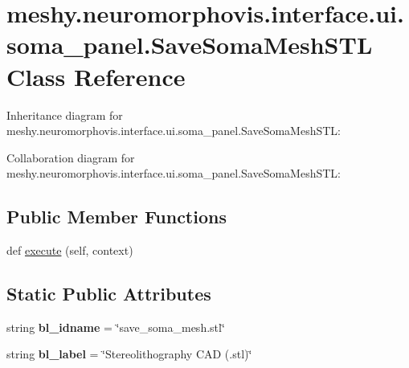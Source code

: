 \hypertarget{classmeshy_1_1neuromorphovis_1_1interface_1_1ui_1_1soma__panel_1_1SaveSomaMeshSTL}{}\section{meshy.\+neuromorphovis.\+interface.\+ui.\+soma\+\_\+panel.\+Save\+Soma\+Mesh\+S\+TL Class Reference}
\label{classmeshy_1_1neuromorphovis_1_1interface_1_1ui_1_1soma__panel_1_1SaveSomaMeshSTL}


Inheritance diagram for meshy.\+neuromorphovis.\+interface.\+ui.\+soma\+\_\+panel.\+Save\+Soma\+Mesh\+S\+TL\+:


Collaboration diagram for meshy.\+neuromorphovis.\+interface.\+ui.\+soma\+\_\+panel.\+Save\+Soma\+Mesh\+S\+TL\+:
\subsection*{Public Member Functions}
\begin{DoxyCompactItemize}
\item 
def \hyperlink{classmeshy_1_1neuromorphovis_1_1interface_1_1ui_1_1soma__panel_1_1SaveSomaMeshSTL_af531407a215235096daee64609436907}{execute} (self, context)
\end{DoxyCompactItemize}
\subsection*{Static Public Attributes}
\begin{DoxyCompactItemize}
\item 
string {\bfseries bl\+\_\+idname} = \char`\"{}save\+\_\+soma\+\_\+mesh.\+stl\char`\"{}\hypertarget{classmeshy_1_1neuromorphovis_1_1interface_1_1ui_1_1soma__panel_1_1SaveSomaMeshSTL_ac07f5b99266d944eeeeccb9d1a773ed9}{}\label{classmeshy_1_1neuromorphovis_1_1interface_1_1ui_1_1soma__panel_1_1SaveSomaMeshSTL_ac07f5b99266d944eeeeccb9d1a773ed9}

\item 
string {\bfseries bl\+\_\+label} = \char`\"{}Stereolithography C\+AD (.stl)\char`\"{}\hypertarget{classmeshy_1_1neuromorphovis_1_1interface_1_1ui_1_1soma__panel_1_1SaveSomaMeshSTL_aece1cd5de45167fdfbbf34668e251175}{}\label{classmeshy_1_1neuromorphovis_1_1interface_1_1ui_1_1soma__panel_1_1SaveSomaMeshSTL_aece1cd5de45167fdfbbf34668e251175}

\end{DoxyCompactItemize}


